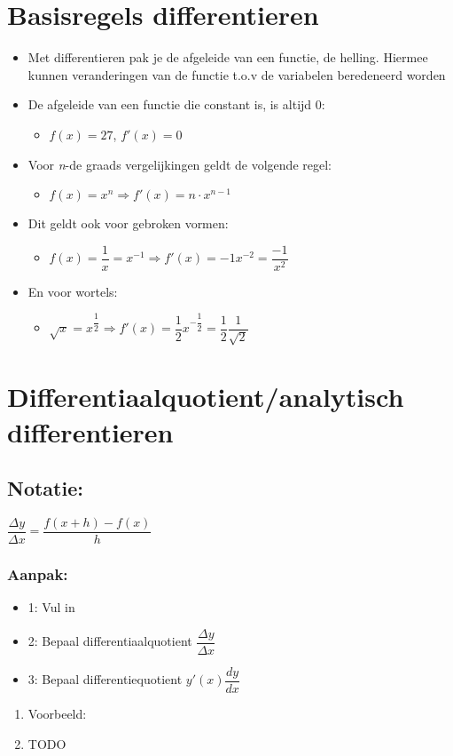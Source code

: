 \documentclass[11pt]{article}
\date{\today}
\title{}
\begin{document}
\tableofcontents

\pagebreak

\section{Basisregels differentieren}
\label{sec:orged11f27}
\begin{itemize}
\item Met differentieren pak je de afgeleide van een functie, de helling. Hiermee kunnen veranderingen van de functie t.o.v de variabelen beredeneerd worden
\item De afgeleide van een functie die constant is, is altijd 0:
\begin{itemize}
\item \(f(x) = 27\), \(f'(x) = 0\)
\end{itemize}
\item Voor \textit{n}-de graads vergelijkingen geldt de volgende regel:
\begin{itemize}
\item \(f(x) = x^{n} \Rightarrow f'(x) = n \cdot x^{n-1}\)
\end{itemize}
\item Dit geldt ook voor gebroken vormen:
\begin{itemize}
\item \(f(x) = \dfrac{1}{x} = x^{-1} \Rightarrow f'(x) = -1x^{-2} = \dfrac{-1}{x^{2}}\)
\end{itemize}
\item En voor wortels:
\begin{itemize}
\item \(\sqrt{x} = x^{\dfrac{1}{2}} \Rightarrow f'(x) = \dfrac{1}{2}x^{-\dfrac{1}{2}} = \dfrac{1}{2}\dfrac{1}{\sqrt{2}}\)
\end{itemize}
\end{itemize}





\section{Differentiaalquotient/analytisch differentieren}
\label{sec:org55a5f57}
\subsection{Notatie:}
\label{sec:orgdf710e4}
\(\dfrac{\Delta y}{\Delta x} = \dfrac{f(x+h) - f(x)}{h}\)
\subsubsection{Aanpak:}
\label{sec:org6e865ac}
\begin{itemize}
\item 1: Vul in
\item 2: Bepaal differentiaalquotient \(\dfrac{\Delta y}{\Delta x}\)
\item 3: Bepaal differentiequotient \(y'(x) \dfrac{dy}{dx}\)
\end{itemize}
\begin{enumerate}
\item Voorbeeld:
\label{sec:org6b7dd92}
\item TODO
\label{sec:orgaf860a1}
\end{enumerate}
\section{}
\label{sec:org81c2c1e}
\end{document}
